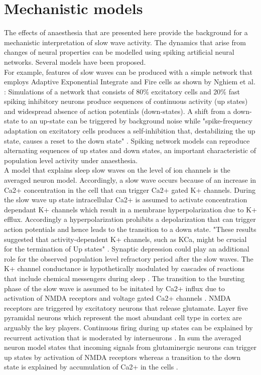 \section{Mechanistic models}
\label{mechanistic_models}
The effects of anaesthesia that are presented here provide the background for a mechanistic interpretation of slow wave activity. The dynamics that arise from changes of neural properties can be modelled using spiking artificial neural networks. Several models have been proposed.\\
For example, features of slow waves can be produced with a simple network that employs Adaptive Exponential Integrate and Fire cells as shown by Nghiem et al. \parencite{nghiem2018two}: Simulations of a network that consists of 80\% excitatory cells and 20\% fast spiking inhibitory neurons produce sequences of continuous activity (up states) and widespread absence of action potentials (down-states). A shift from a down-state to an up-state can be triggered by background noise while "spike-frequency adaptation on excitatory cells produces a self-inhibition that, destabilizing the up state, causes a reset to the down state" \parencite[p. 2]{nghiem2018two}. Spiking network models can reproduce alternating sequences of up states and down states, an important characteristic of population level activity under anaesthesia. \\
A model that explains sleep slow waves on the level of ion channels is the averaged neuron model. Accordingly, a slow wave occurs because of an increase in Ca2+ concentration in the cell that can trigger Ca2+ gated K+ channels. During the slow wave up state intracellular Ca2+ is assumed to activate concentration dependant K+ channels which result in a membrane hyperpolarization due to K+ efflux. Accordingly a hyperpolarization prohibits a depolarization that can trigger action potentials and hence leads to the transition to a down state. "These results suggested that activity-dependent K+ channels, such as KCa, might be crucial for the termination of Up states" \parencite{neske2016slow}. Synaptic depression could play an additional role for the observed population level refractory period after the slow waves. The K+ channel conductance is hypothetically modulated by cascades of reactions that include chemical messengers during sleep \parencite{shi2019genes}. The transition to the bursting phase of the slow wave is assumed to be initated by Ca2+ influx due to activation of NMDA receptors and voltage gated Ca2+ channels \parencite{shi2018ca2+}. NMDA receptors are triggered by excitatory neurons that release glutamate. Layer five pyramidal neurons which represent the most abundant cell type in cortex are arguably the key players. Continuous firing during up states can be explained by recurrent activation that is moderated by interneurons \parencite{neske2016slow}. In sum the averaged neuron model states that incoming signals from glutaminergic neurons can trigger up states by activation of NMDA receptors whereas a transition to the down state is explained by accumulation of Ca2+ in the cells \parencite{shi2019genes}.\\
